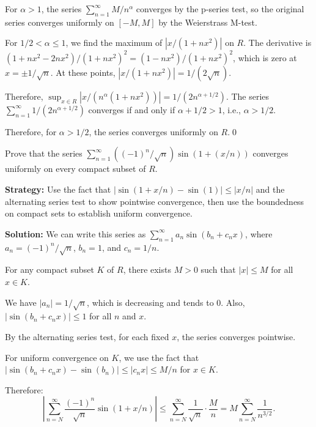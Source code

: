 For \( \alpha > 1 \), the series \( \sum_{n=1}^{\infty} M/n^\alpha \) converges by the p-series test, so the original series converges uniformly on \([-M, M]\) by the Weierstrass M-test.

For \( 1/2 < \alpha \leq 1 \), we find the maximum of \( |x/(1 + nx^2)| \) on \( R \). The derivative is \( (1 + nx^2 - 2nx^2)/(1 + nx^2)^2 = (1 - nx^2)/(1 + nx^2)^2 \), which is zero at \( x = \pm 1/\sqrt{n} \). At these points, \( |x/(1 + nx^2)| = 1/(2\sqrt{n}) \).

Therefore, \( \sup_{x \in R} |x/(n^\alpha (1 + nx^2))| = 1/(2n^{\alpha + 1/2}) \). The series \( \sum_{n=1}^{\infty} 1/(2n^{\alpha + 1/2}) \) converges if and only if \( \alpha + 1/2 > 1 \), i.e., \( \alpha > 1/2 \).

Therefore, for \( \alpha > 1/2 \), the series converges uniformly on \( R \).\qed


\begin{problembox}
Prove that the series \(\sum_{n=1}^{\infty} ((-1)^n/\sqrt{n}) \sin (1 + (x/n))\) converges uniformly on every compact subset of \( R \).
\end{problembox}

\noindent\textbf{Strategy:} Use the fact that \( |\sin(1 + x/n) - \sin(1)| \leq |x/n| \) and the alternating series test to show pointwise convergence, then use the boundedness on compact sets to establish uniform convergence.

\bigskip\noindent\textbf{Solution:} We can write this series as \( \sum_{n=1}^{\infty} a_n \sin(b_n + c_n x) \), where \( a_n = (-1)^n/\sqrt{n} \), \( b_n = 1 \), and \( c_n = 1/n \).

For any compact subset \( K \) of \( R \), there exists \( M > 0 \) such that \( |x| \leq M \) for all \( x \in K \).

We have \( |a_n| = 1/\sqrt{n} \), which is decreasing and tends to 0. Also, \( |\sin(b_n + c_n x)| \leq 1 \) for all \( n \) and \( x \).

By the alternating series test, for each fixed \( x \), the series converges pointwise.

For uniform convergence on \( K \), we use the fact that \( |\sin(b_n + c_n x) - \sin(b_n)| \leq |c_n x| \leq M/n \) for \( x \in K \).

Therefore:
\[\left|\sum_{n=N}^{\infty} \frac{(-1)^n}{\sqrt{n}} \sin(1 + x/n)\right| \leq \sum_{n=N}^{\infty} \frac{1}{\sqrt{n}} \cdot \frac{M}{n} = M \sum_{n=N}^{\infty} \frac{1}{n^{3/2}}.\]

